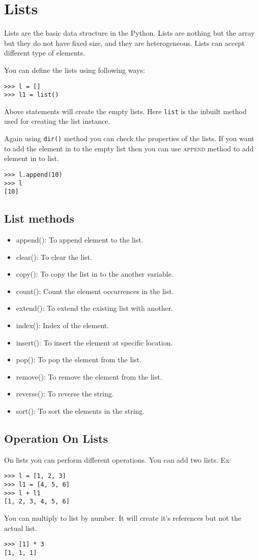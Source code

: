 \documentclass[letterpaper,12pt]{book}
\begin{document}
\section{Lists}
Lists are the basic data structure in the Python. Lists are nothing but the array but they do not have fixed size, and they are heterogeneous. Lists can accept different type of elements.

You can define the lists using following ways:
\begin{verbatim}
>>> l = []
>>> l1 = list()
\end{verbatim}
Above statements will create the empty lists. Here \texttt{list} is the inbuilt method used for creating the list instance.

Again using \texttt{dir()} method you can check the properties of the lists.
If you want to add the element in to the empty list then you can use \textsc{append} method to add element in to list.
\begin{verbatim}
>>> l.append(10)
>>> l
[10]
\end{verbatim}
\subsection{List methods}
\begin{itemize}
\item append(): To append element to the list.
\item clear(): To clear the list.
\item copy(): To copy the list in to the another variable.
\item count(): Count the element occurrences in the list.
\item extend(): To extend the existing list with another.
\item index(): Index of the element.
\item insert(): To insert the element at specific location.
\item pop(): To pop the element from the list.
\item remove(): To remove the element from the list.
\item reverse(): To reverse the string.
\item sort(): To sort the elements in the string.
\end{itemize}

\subsection{Operation On Lists}
On lists you can perform different operations. You can add two lists. Ex:
\begin{verbatim}
>>> l = [1, 2, 3]
>>> l1 = [4, 5, 6]
>>> l + l1
[1, 2, 3, 4, 5, 6]
\end{verbatim}
You can multiply to list by number. It will create it's references but not the actual list.
\begin{verbatim}
>>> [1] * 3
[1, 1, 1]
\end{verbatim}
\end{document}
